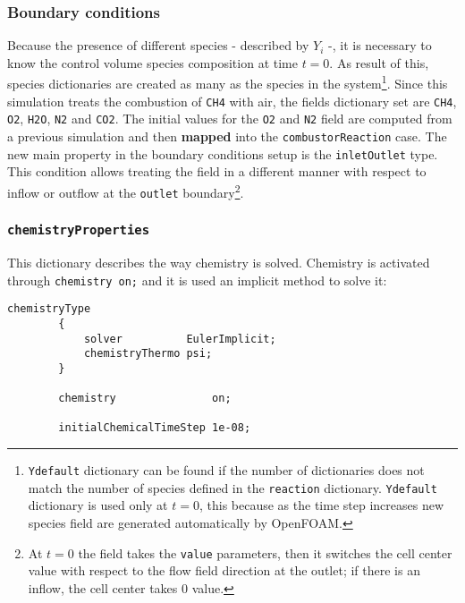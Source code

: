     \subsubsection{Boundary conditions}
    Because the presence of different species - described by $Y_i$ -, it is necessary to know the control volume species composition at time $t = 0$. As result of this, species dictionaries are created as many as the species in the system\cprotect\footnote{\verb|Ydefault| dictionary can be found if the number of dictionaries does not match the number of species defined in the \verb|reaction| dictionary. \verb|Ydefault| dictionary is used only at $t = 0$, this because as the time step increases new species field are generated automatically by OpenFOAM.}. Since this simulation treats the combustion of \verb|CH4| with air, the fields dictionary set are \verb|CH4|, \verb|O2|, \verb|H2O|, \verb|N2| and \verb|CO2|. The initial values for the \verb|O2| and \verb|N2| field are computed from a previous simulation and then \textbf{mapped} into the \verb|combustorReaction| case. The new main property in the boundary conditions setup is the \verb|inletOutlet| type. This condition allows treating the field in a different manner with respect to inflow or outflow at the \verb|outlet| boundary\cprotect\footnote{At $t = 0$ the field takes the \verb|value| parameters, then it switches the cell center value with respect to the flow field direction at the outlet; if there is an inflow, the cell center takes $0$ value.}.

    \cprotect\subsubsection{\verb|chemistryProperties|}
    This dictionary describes the way chemistry is solved. Chemistry is activated through \verb|chemistry on;| and it is used an implicit method to solve it:
    \begin{lstlisting}[caption = $\mathtt{combustorReaction/constant/chemistryProperties}$ implicit chemistry model setup., label = list:chemProp]
        chemistryType
        {
            solver          EulerImplicit;
            chemistryThermo psi;
        }

        chemistry               on;

        initialChemicalTimeStep 1e-08;
    \end{lstlisting}
    
